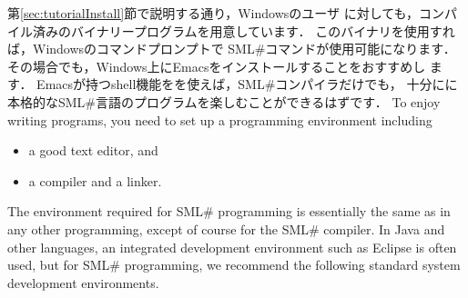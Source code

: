 \documentclass{jbook}
\newcommand{\smlsharp}{SML\#}
\begin{document}
	第\ref{sec:tutorialInstall}節で説明する通り，Windowsのユーザ
に対しても，コンパイル済みのバイナリープログラムを用意しています．
	このバイナリを使用すれば，Windowsのコマンドプロンプトで
\smlsharp{}コマンドが使用可能になります．
	その場合でも，Windows上にEmacsをインストールすることをおすすめし
ます．
	Emacsが持つshell機能をを使えば，\smlsharp{}コンパイラだけでも，
十分にに本格的な\smlsharp{}言語のプログラムを楽しむことができるはずです．
\else%
	To enjoy writing programs, you need to set up a programming
environment including 
\begin{itemize}
\item a good text editor, and
\item a compiler and a linker.
\end{itemize}
	The environment required for \smlsharp{} programming is
essentially the same as in any other programming, except of course for
the \smlsharp{} compiler.
	In Java and other languages, an integrated development
environment such as Eclipse is often used, but for \smlsharp{}
programming, we recommend the following standard system development
environments.
\end{document}
